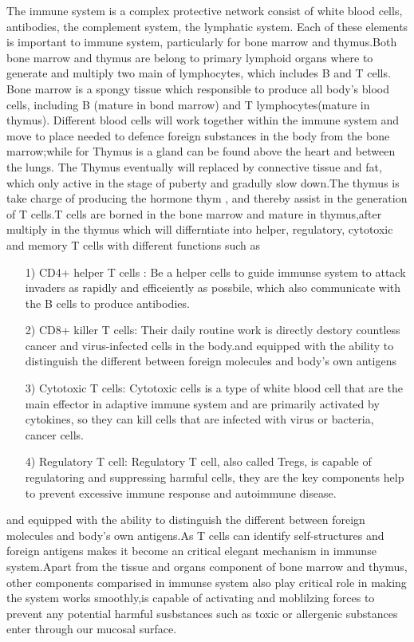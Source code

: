 \documentclass[12pt]{article}
\begin{document}
The immune system is a complex protective network consist of  white blood cells, antibodies, the complement system, the lymphatic system. Each of these elements is important to immune system, particularly for bone marrow and thymus.Both bone marrow and thymus are belong to primary lymphoid organs where to  generate and multiply two main of lymphocytes, which includes B and T cells.
Bone marrow is a spongy tissue which responsible to produce all body's blood cells, including B (mature in bond marrow) and T lymphocytes(mature in thymus). Different blood cells will work together within the immune system and  move to place needed to defence foreign substances in the body from the bone marrow;while for Thymus is a gland can be found above the heart and between the lungs. The Thymus eventually will replaced by connective tissue and fat, which only active in the stage of puberty and gradully slow down.The thymus is take charge of producing the hormone thym , and thereby assist in the generation of T cells.T cells are borned in the bone marrow and mature in thymus,after multiply in the thymus which will differntiate into helper, regulatory,  cytotoxic and memory T cells with different functions such as 
\begin{itemize}
    \item [1)] 
    CD4+ helper T cells : Be a helper cells to guide immunse system to attack invaders as rapidly and efficeiently as possbile, which also communicate with the B cells to produce antibodies.
    \item [2)]
    CD8+ killer T cells: Their daily routine work is directly destory countless cancer and virus-infected cells in the body.and equipped with the ability to distinguish the different between foreign molecules and body's own antigens
    \item [3)]
    Cytotoxic T cells:
    Cytotoxic cells is a type of white blood cell that are the main effector in adaptive immune system and are primarily activated by cytokines, so they can kill cells that are infected with virus or bacteria, cancer cells.
    \item [4)]
    Regulatory T cell:
    Regulatory T cell, also called Tregs, is capable of regulatoring and suppressing harmful cells, they are the key components help to prevent excessive immune response and autoimmune disease.
\end{itemize}
and equipped with the ability to distinguish the different between foreign molecules and body's own antigens.As T cells can identify self-structures and foreign antigens makes it become an critical elegant mechanism in immunse system.Apart from the tissue and organs component of bone marrow and thymus, other components comparised in immunse system also play critical role in making the system works smoothly,is capable of activating and moblilzing forces to prevent any  potential harmful susbstances such as toxic or allergenic substances enter through our mucosal surface.\medskip
\end{document}

